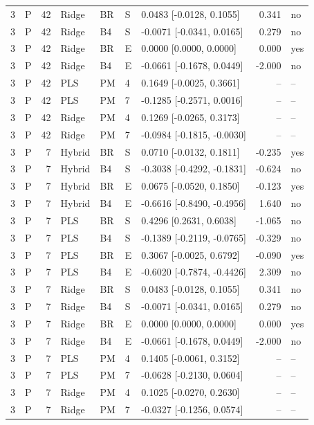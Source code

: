 \documentclass[10pt,a4paper]{article}
\begin{document}
\begin{longtable}{rlrllllrl}
3 & P & 42 & Ridge & BR & S & 0.0483 [-0.0128, 0.1055] & 0.341 & no \\
3 & P & 42 & Ridge & B4 & S & -0.0071 [-0.0341, 0.0165] & 0.279 & no \\
3 & P & 42 & Ridge & BR & E & 0.0000 [0.0000, 0.0000] & 0.000 & yes \\
3 & P & 42 & Ridge & B4 & E & -0.0661 [-0.1678, 0.0449] & -2.000 & no \\
3 & P & 42 & PLS & PM & 4 & 0.1649 [-0.0025, 0.3661] & -- & -- \\
3 & P & 42 & PLS & PM & 7 & -0.1285 [-0.2571, 0.0016] & -- & -- \\
3 & P & 42 & Ridge & PM & 4 & 0.1269 [-0.0265, 0.3173] & -- & -- \\
3 & P & 42 & Ridge & PM & 7 & -0.0984 [-0.1815, -0.0030] & -- & -- \\
3 & P & 7 & Hybrid & BR & S & 0.0710 [-0.0132, 0.1811] & -0.235 & yes \\
3 & P & 7 & Hybrid & B4 & S & -0.3038 [-0.4292, -0.1831] & -0.624 & no \\
3 & P & 7 & Hybrid & BR & E & 0.0675 [-0.0520, 0.1850] & -0.123 & yes \\
3 & P & 7 & Hybrid & B4 & E & -0.6616 [-0.8490, -0.4956] & 1.640 & no \\
3 & P & 7 & PLS & BR & S & 0.4296 [0.2631, 0.6038] & -1.065 & no \\
3 & P & 7 & PLS & B4 & S & -0.1389 [-0.2119, -0.0765] & -0.329 & no \\
3 & P & 7 & PLS & BR & E & 0.3067 [-0.0025, 0.6792] & -0.090 & yes \\
3 & P & 7 & PLS & B4 & E & -0.6020 [-0.7874, -0.4426] & 2.309 & no \\
3 & P & 7 & Ridge & BR & S & 0.0483 [-0.0128, 0.1055] & 0.341 & no \\
3 & P & 7 & Ridge & B4 & S & -0.0071 [-0.0341, 0.0165] & 0.279 & no \\
3 & P & 7 & Ridge & BR & E & 0.0000 [0.0000, 0.0000] & 0.000 & yes \\
3 & P & 7 & Ridge & B4 & E & -0.0661 [-0.1678, 0.0449] & -2.000 & no \\
3 & P & 7 & PLS & PM & 4 & 0.1405 [-0.0061, 0.3152] & -- & -- \\
3 & P & 7 & PLS & PM & 7 & -0.0628 [-0.2130, 0.0604] & -- & -- \\
3 & P & 7 & Ridge & PM & 4 & 0.1025 [-0.0270, 0.2630] & -- & -- \\
3 & P & 7 & Ridge & PM & 7 & -0.0327 [-0.1256, 0.0574] & -- & -- \\

\end{longtable}
\end{document}

